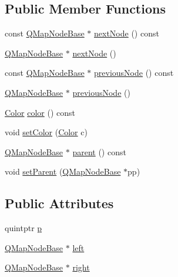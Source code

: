 \subsection*{Public Member Functions}
\begin{DoxyCompactItemize}
\item 
const \hyperlink{struct_q_map_node_base}{Q\+Map\+Node\+Base} $\ast$ \hyperlink{struct_q_map_node_base_a0d003f88dea1eeda422c13636e2b0ff3}{next\+Node} () const 
\item 
\hyperlink{struct_q_map_node_base}{Q\+Map\+Node\+Base} $\ast$ \hyperlink{struct_q_map_node_base_a17a54c9b7145eb57325572c7b46da3f7}{next\+Node} ()
\item 
const \hyperlink{struct_q_map_node_base}{Q\+Map\+Node\+Base} $\ast$ \hyperlink{struct_q_map_node_base_a2036d1497e841434aa2bec59fd354036}{previous\+Node} () const 
\item 
\hyperlink{struct_q_map_node_base}{Q\+Map\+Node\+Base} $\ast$ \hyperlink{struct_q_map_node_base_af195b636253052fdd9aa8136e1d00169}{previous\+Node} ()
\item 
\hyperlink{struct_q_map_node_base_a8d262e109c5db0292c19141d585c96a9}{Color} \hyperlink{struct_q_map_node_base_ab9fd1e541601e17776f0eb3631f4722b}{color} () const 
\item 
void \hyperlink{struct_q_map_node_base_afe2e35dbcd8325173886c887447e88fc}{set\+Color} (\hyperlink{struct_q_map_node_base_a8d262e109c5db0292c19141d585c96a9}{Color} c)
\item 
\hyperlink{struct_q_map_node_base}{Q\+Map\+Node\+Base} $\ast$ \hyperlink{struct_q_map_node_base_ac41f93c0fbcab11e562fc760d78ec485}{parent} () const 
\item 
void \hyperlink{struct_q_map_node_base_a7846f9d0541b7e18680baf16bed97d9c}{set\+Parent} (\hyperlink{struct_q_map_node_base}{Q\+Map\+Node\+Base} $\ast$pp)
\end{DoxyCompactItemize}
\subsection*{Public Attributes}
\begin{DoxyCompactItemize}
\item 
quintptr \hyperlink{struct_q_map_node_base_a41743f32441f17a64e8faaf7f42d0bfb}{p}
\item 
\hyperlink{struct_q_map_node_base}{Q\+Map\+Node\+Base} $\ast$ \hyperlink{struct_q_map_node_base_a5334085d1e9ededc044ea0b5551ed7fd}{left}
\item 
\hyperlink{struct_q_map_node_base}{Q\+Map\+Node\+Base} $\ast$ \hyperlink{struct_q_map_node_base_a8eae5d979c668347872c31b956626a68}{right}
\end{DoxyCompactItemize}


